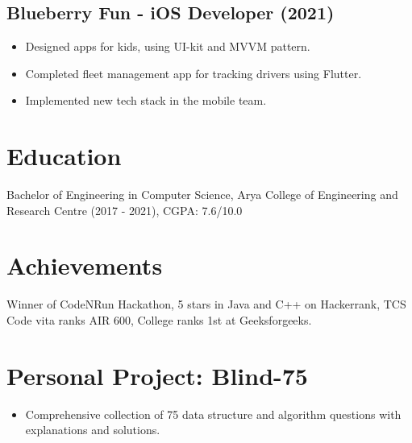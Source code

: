 \documentclass[a4paper,10pt]{article}
\begin{document}
\subsection*{Blueberry Fun - iOS Developer (2021)}
\begin{itemize}
    \item Designed apps for kids, using UI-kit and MVVM pattern.
    \item Completed fleet management app for tracking drivers using Flutter.
    \item Implemented new tech stack in the mobile team.
\end{itemize}

\section*{Education}
Bachelor of Engineering in Computer Science, Arya College of Engineering and Research Centre (2017 - 2021), CGPA: 7.6/10.0

\section*{Achievements}
Winner of CodeNRun Hackathon, 5 stars in Java and C++ on Hackerrank, TCS Code vita ranks AIR 600, College ranks 1st at Geeksforgeeks.

\section*{Personal Project: Blind-75}
\begin{itemize}
    \item Comprehensive collection of 75 data structure and algorithm questions with explanations and solutions.
\end{itemize}
\end{document}
